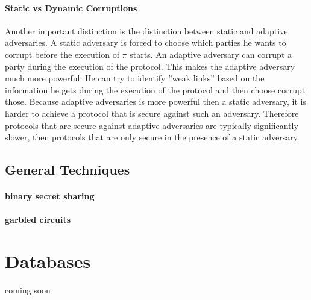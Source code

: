\paragraph{Static vs Dynamic Corruptions}
Another important distinction is the distinction between static and adaptive adversaries. A static adversary is forced to choose which parties he wants to corrupt before the execution of $ \pi $ starts. An adaptive adversary can corrupt a party during the execution of the protocol. This makes the adaptive adversary much more powerful. He can try to identify ''weak links'' based on the information he gets during the execution of the protocol and then choose corrupt those. Because adaptive adversaries is more powerful then a static adversary, it is harder to achieve a protocol that is secure against such an adversary. Therefore protocols that are secure against adaptive adversaries are typically significantly slower, then protocols that are only secure in the presence of a static adversary.


\subsection{General Techniques}
\paragraph{binary secret sharing} 
\paragraph{garbled circuits}

\section{Databases}
\label{Databases}
coming soon